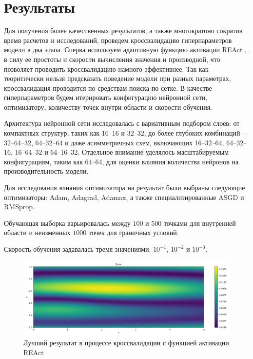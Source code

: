 \chapter{Результаты}
Для получения более качественных результатов, а также многократоно
сократив время расчетов и исследований, проведем кроссвалидацию
гиперпараметров модели в два этапа. Сперва используем адаптивную
функцию активации REAct \cite{0d752c79fb816703274a3d37f85a85689a2a9405},
в силу ее простоты и скорости вычисления значения и производной, что 
позволяет проводить кроссвалидацию намного эффективнее. Так как теоритически
нельзя предсказать поведение модели при разных параметрах, кроссвалидация
проводится по средствам поиска по сетке. В качестве
гиперпараметров будем итерировать конфигурацию нейронной сети, оптимизатору,
количеству точек внутри области и скорости обучения.

Архитектура нейронной сети исследовалась с вариативным подбором слоёв:
от компактных структур, таких как 16–16 и 32–32, до более глубоких
комбинаций --- 32–64–32, 64–32–64 и даже асимметричных схем, включающих
16–32–64, 64–32–16, 16–64–32 и 64–16–32. Отдельное внимание уделялось
масштабируемым конфигурациям, таким как 64–64, для оценки влияния
количества нейронов на производительность модели.

Для исследования влияния оптимизатора на результат были выбраны
следующие оптимизаторы: Adam, Adagrad, Adamax, а также специализированные
ASGD и RMSprop.

Обучающая выборка варьировалась между $100$ и $500$ точками для внутренней
области и неизменных $1000$ точек для граничных условий. 

Скорость обучения задавалась тремя значениями: $10^{-1}$, $10^{-2}$ и $10^{-3}$.


\begin{figure}[ht]
    \includegraphics{data/couette_react_error_best.png}
    \caption{Лучший результат в процессе кроссвалидации с функцией активации REAct}
    \label{fig:couette_react_best}
\end{figure}


